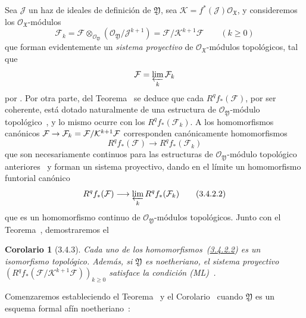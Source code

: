 \documentclass[10pt,oneside,openany]{book}
\theoremstyle{egaenv}\newtheorem*{env}{---}
\theoremstyle{egastatement}
\newtheorem*{corollary}{Corolario}
\theoremstyle{egadescription}
\newcommand{\oldpage}[2][]{\marginnote{\normalfont\scriptsize\textbf{#1}\,|\,#2}\ignorespaces}
\renewcommand{\geq}{\geqslant}
\renewcommand{\to}{\mathchoice{\longrightarrow}{\rightarrow}{\rightarrow}{\rightarrow}}
\begin{document}
Sea $\mathcal J$ un haz de ideales de definición de $\mathfrak Y$, sea $\mathcal K=f^*(\mathcal J)\mathcal O_{\mathfrak X}$, y consideremos los $\mathcal O_{\mathfrak X}$-módulos
\[
\mathcal F_k=\mathcal F\otimes_{\mathcal O_{\mathfrak Y}}
(\mathcal O_{\mathfrak Y}/\mathcal J^{k+1})
=\mathcal F/\mathcal K^{k+1}\mathcal F\qquad(k\geq0)
\tag{3.4.2.1}\label{III.3.4.2.1-fr}
\]
que forman evidentemente un \emph{sistema proyectivo} de $\mathcal O_{\mathfrak X}$-módulos topológicos, tal que
\oldpage[III]{120}
\[
\mathcal F=\varprojlim_k\mathcal F_k
\]
por .
Por otra parte, del Teorema~ se deduce que cada $R^qf_*(\mathcal F)$, por ser coherente, está dotado naturalmente de una estructura de $\mathcal O_{\mathfrak Y}$-módulo topológico~, y lo mismo ocurre con los $R^qf_*(\mathcal F_k)$.
A los homomorfismos canónicos $\mathcal F\to\mathcal F_k=\mathcal F/\mathcal K^{k+1}\mathcal F$ corresponden canónicamente homomorfismos
\[
R^qf_*(\mathcal F)\longrightarrow R^qf_*(\mathcal F_k)
\]
que son necesariamente continuos para las estructuras de $\mathcal O_{\mathfrak Y}$-módulo topológico anteriores~ y forman un sistema proyectivo, dando en el límite un homomorfismo funtorial canónico
\[
R^qf_*(\mathcal F)\longrightarrow\varprojlim_kR^qf_*(\mathcal F_k)
\tag{3.4.2.2}\label{III.3.4.2.2-fr}
\]
que es un homomorfismo continuo de $\mathcal O_{\mathfrak Y}$-módulos topológicos.
Junto con el Teorema~, demostraremos el
\begin{corollary}[3.4.3]
\label{III.3.4.3}
\label{III.3.4.3-fr}
Cada uno de los homomorfismos~(\hyperref[III.3.4.2.2]{3.4.2.2}) es un isomorfismo topológico.
Además, si $\mathfrak Y$ es noetheriano, el sistema proyectivo $(R^qf_*(\mathcal F/\mathcal K^{k+1}\mathcal F))_{k\geq0}$ satisface la condición \emph{(ML)}~.
\end{corollary}
Comenzaremos estableciendo el Teorema~ y el Corolario~ cuando $\mathfrak Y$ es un esquema formal afín noetheriano~:
\end{document}
